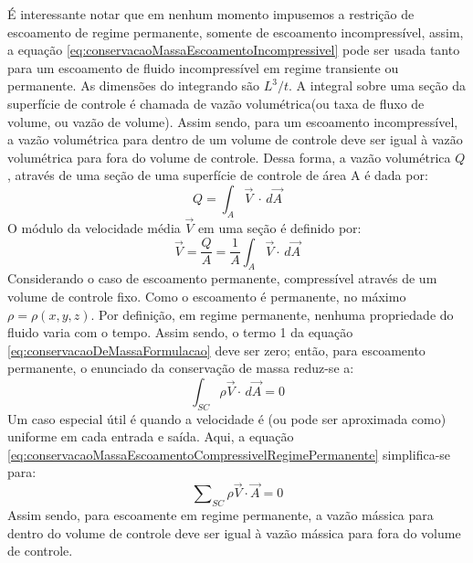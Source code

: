 \documentclass{article}
\begin{document}
É interessante notar que em nenhum momento impusemos a restrição de escoamento de regime permanente, somente de escoamento incompressível, assim, a equação \ref{eq:conservacaoMassaEscoamentoIncompressivel} pode ser usada tanto para um escoamento de fluido incompressível em regime transiente ou permanente. As dimensões do integrando são $L^3/t$. A integral sobre uma seção da superfície de controle é chamada de vazão volumétrica(ou taxa de fluxo de volume, ou vazão de volume). Assim sendo, para um escoamento incompressível, a vazão volumétrica para dentro de um volume de controle deve ser igual à vazão volumétrica para fora do volume de controle. Dessa forma, a vazão volumétrica $Q$, através de uma seção de uma superfície de controle de área A é dada por:
\begin{equation}
  Q=\int_{A}^{ } \vec{V}\ \cdot\, d\vec{A}
  \label{eq:vazaoVolumetrica}
\end{equation}
O módulo da velocidade média $\vec{V}$ em uma seção é definido por:
\begin{equation}
    \vec{V}=\frac{Q}{A}=\frac{1}{A}\int_{A}^{ } \vec{V} \cdot\, d\vec{A}
  \label{eq:moduloVelocidadeMedia}
\end{equation}
Considerando o caso de escoamento permanente, compressível através de um volume de controle fixo. Como o escoamento é permanente, no máximo $\rho=\rho(x,y,z)$. Por definição, em regime permanente, nenhuma propriedade do fluido varia com o tempo. Assim sendo, o termo 1 da equação \ref{eq:conservacaoDeMassaFormulacao} deve ser zero; então, para escoamento permanente, o enunciado da conservação de massa reduz-se a:
\begin{equation}
    \int_{SC}^{ } \rho \vec{V} \cdot \, d\vec{A}=0
  \label{eq:conservacaoMassaEscoamentoCompressivelRegimePermanente}
\end{equation}
Um caso especial útil é quando a velocidade é (ou pode ser aproximada como) uniforme em cada entrada e saída. Aqui, a equação \ref{eq:conservacaoMassaEscoamentoCompressivelRegimePermanente} simplifica-se para:
\begin{equation}
    \sum\nolimits_{SC} \rho \vec{V} \cdot \vec{A}=0
  \label{eq:conservacaoMassaEscoamentoCompressivelRegimePermanenteVelocidadeUniforme}
\end{equation}
Assim sendo, para escoamente em regime permanente, a vazão mássica para dentro do volume de controle deve ser igual à vazão mássica para fora do volume de controle.
\end{document}
